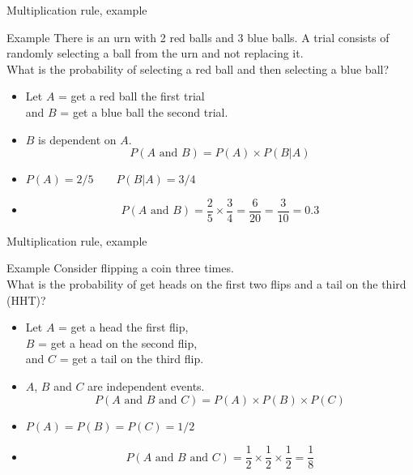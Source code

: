 \documentclass[xcolor=table]{beamer}
\begin{document}
\begin{frame}{Multiplication rule, example}
\begin{exampleblock}{Example}
There is an urn with 2 red balls and 3 blue balls. A trial consists of randomly selecting a ball from the urn and not replacing it.\\
\medskip 
What is the probability of selecting a red ball and then selecting a blue ball?
\begin{itemize}
\pause
\item Let $A$ = get a red ball the first trial\\
 and $B$ = get a blue ball the second trial.\\

\pause
\item $B$ is dependent on $A$.
\[P(A \text{ and } B) = P(A) \times P(B|A)\]

\pause
\item $P(A) = 2/5 \qquad P(B|A) = 3/4$

\pause
\item
\[P(A \text{ and } B) = \frac 2 5 \times \frac 3 4 = \frac 6 {20} = \frac 3 {10} = 0.3\]

\end{itemize}

\end{exampleblock}
\end{frame}

\begin{frame}{Multiplication rule, example}
\begin{exampleblock}{Example}
Consider flipping a coin three times.\\
\medskip 
What is the probability of get heads on the first two flips and a tail on the third (HHT)?
\begin{itemize}
\pause
\item Let $A$ = get a head the first flip,\\
 $B$ = get a head on the second flip,\\
and $C$ = get a tail on the third flip.

\pause
\item $A$, $B$ and $C$ are independent events. 
\[P(A \text{ and } B \text{ and } C) = P(A) \times P(B) \times P(C)\]

\pause
\item $P(A) = P(B) = P(C) = 1/2$

\pause
\item
\[P(A \text{ and } B \text{ and } C) = \frac 1 2 \times \frac 1 2 \times \frac 1 2 = \frac 1 8\]

\end{itemize}

\end{exampleblock}
\end{frame}
\end{document}
